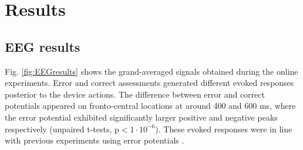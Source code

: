 


\section{Results}
\label{sec:results}

\subsection{EEG results} Fig. \ref{fig:EEGresults} shows the grand-averaged signals obtained during the online experiments. Error and correct assessments generated different evoked responses posterior to the device actions. The difference between error and correct potentials appeared on fronto-central locations at around 400 and 600 ms, where the error potential exhibited significantly larger positive and negative peaks respectively (unpaired t-tests, p$<1 \cdot 10^{-6}$). These evoked responses were in line with previous experiments using error potentials \cite{chavarriaga2010learning, iturrate13}.

